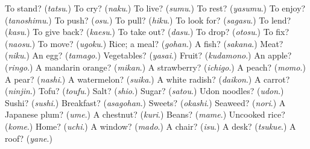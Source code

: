 \begin{tcolorbox}[breakable,colback=teal!4,colframe=teal!35!black,title={Before you move on}]
To stand? (\emph{tatsu}.) To cry? (\emph{naku}.) To live? (\emph{sumu}.) To rest? (\emph{yasumu}.) To enjoy? (\emph{tanoshimu}.) To push? (\emph{osu}.) To pull? (\emph{hiku}.) To look for? (\emph{sagasu}.) To lend? (\emph{kasu}.) To give back? (\emph{kaesu}.) To take out? (\emph{dasu}.) To drop? (\emph{otosu}.) To fix? (\emph{naosu}.) To move? (\emph{ugoku}.) Rice; a meal? (\emph{gohan}.) A fish? (\emph{sakana}.) Meat? (\emph{niku}.) An egg? (\emph{tamago}.) Vegetables? (\emph{yasai}.) Fruit? (\emph{kudamono}.) An apple? (\emph{ringo}.) A mandarin orange? (\emph{mikan}.) A strawberry? (\emph{ichigo}.) A peach? (\emph{momo}.) A pear? (\emph{nashi}.) A watermelon? (\emph{suika}.) A white radish? (\emph{daikon}.) A carrot? (\emph{ninjin}.) Tofu? (\emph{toufu}.) Salt? (\emph{shio}.) Sugar? (\emph{satou}.) Udon noodles? (\emph{udon}.) Sushi? (\emph{sushi}.) Breakfast? (\emph{asagohan}.) Sweets? (\emph{okashi}.) Seaweed? (\emph{nori}.) A Japanese plum? (\emph{ume}.) A chestnut? (\emph{kuri}.) Beans? (\emph{mame}.) Uncooked rice? (\emph{kome}.) Home? (\emph{uchi}.) A window? (\emph{mado}.) A chair? (\emph{isu}.) A desk? (\emph{tsukue}.) A roof? (\emph{yane}.)
\end{tcolorbox}
